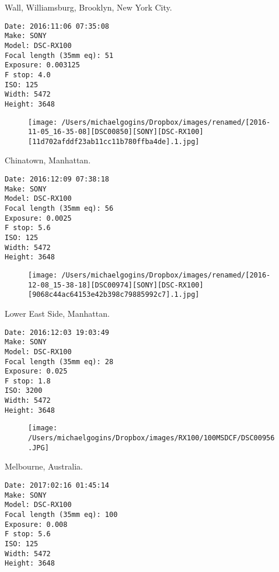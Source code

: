 \documentclass[11pt,letter,DIV=14,paper=landscape]{scrbook}
\begin{document}
\clearpage
\noindent Wall, Williamsburg, Brooklyn, New York City.
\noindent
\begin{lstlisting}
Date: 2016:11:06 07:35:08
Make: SONY
Model: DSC-RX100
Focal length (35mm eq): 51
Exposure: 0.003125
F stop: 4.0
ISO: 125
Width: 5472
Height: 3648
\end{lstlisting}
\clearpage

\begin{figure}
\texttt{[image: /Users/michaelgogins/Dropbox/images/renamed/[2016-11-05\_16-35-08][DSC00850][SONY][DSC-RX100][11d702afddf23ab11cc11b780ffba4de].1.jpg]}
\end{figure}
    
\clearpage
\noindent Chinatown, Manhattan.
\noindent
\begin{lstlisting}
Date: 2016:12:09 07:38:18
Make: SONY
Model: DSC-RX100
Focal length (35mm eq): 56
Exposure: 0.0025
F stop: 5.6
ISO: 125
Width: 5472
Height: 3648
\end{lstlisting}
\clearpage

\begin{figure}
\texttt{[image: /Users/michaelgogins/Dropbox/images/renamed/[2016-12-08\_15-38-18][DSC00974][SONY][DSC-RX100][9068c44ac64153e42b398c79885992c7].1.jpg]}
\end{figure}
    
\clearpage
\noindent Lower East Side, Manhattan.
\noindent
\begin{lstlisting}
Date: 2016:12:03 19:03:49
Make: SONY
Model: DSC-RX100
Focal length (35mm eq): 28
Exposure: 0.025
F stop: 1.8
ISO: 3200
Width: 5472
Height: 3648
\end{lstlisting}
\clearpage

\begin{figure}
\texttt{[image: /Users/michaelgogins/Dropbox/images/RX100/100MSDCF/DSC00956.JPG]}
\end{figure}
    
\clearpage
\noindent Melbourne, Australia.
\noindent
\begin{lstlisting}
Date: 2017:02:16 01:45:14
Make: SONY
Model: DSC-RX100
Focal length (35mm eq): 100
Exposure: 0.008
F stop: 5.6
ISO: 125
Width: 5472
Height: 3648
\end{lstlisting}
\clearpage
\end{document}
